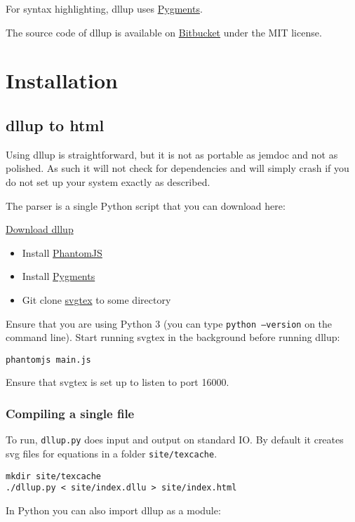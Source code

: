 For syntax highlighting, dllup uses \href{http://pygments.org/}{Pygments}.

The source code of dllup is available on \href{https://bitbucket.org/dllu/dllup/}{Bitbucket} under the MIT license.

\section{Installation}
\label{s4}
\subsection{dllup to html}
\label{s4.1}
Using dllup is straightforward, but it is not as portable as jemdoc and not as polished. As such it will not check for dependencies and will simply crash if you do not set up your system exactly as described.

The parser is a single Python script that you can download here:

\begin{center}\huge \href{https://bitbucket.org/dllu/dllup/raw/master/dllup.py}{Download dllup}\end{center}
\begin{itemize}\item Install \href{http://phantomjs.org/}{PhantomJS}
\item Install \href{http://pygments.org/}{Pygments}
\item Git clone \href{https://github.com/linuxfrorg/svgtex}{svgtex} to some directory
\end{itemize}
Ensure that you are using Python 3 (you can type \texttt{python --version} on the command line). Start running svgtex in the background before running dllup:

\begin{lstlisting}
phantomjs main.js
\end{lstlisting}
Ensure that svgtex is set up to listen to port 16000.

\subsubsection{Compiling a single file}
\label{s4.1.1}
To run, \texttt{dllup.py} does input and output on standard IO. By default it creates svg files for equations in a folder \texttt{site/texcache}.

\begin{lstlisting}
mkdir site/texcache
./dllup.py < site/index.dllu > site/index.html
\end{lstlisting}
In Python you can also import dllup as a module:

